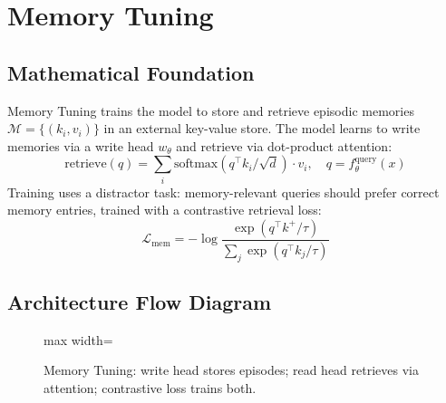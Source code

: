 \newpage
\section{Memory Tuning}

\subsection{Mathematical Foundation}
Memory Tuning trains the model to store and retrieve episodic memories $\mathcal{M} = \{(k_i, v_i)\}$ in an external key-value store. The model learns to write memories via a write head $w_\theta$ and retrieve via dot-product attention:
\begin{equation}
  \text{retrieve}(q) = \sum_i \text{softmax}(q^\top k_i / \sqrt{d}) \cdot v_i,\quad q = f_\theta^{\text{query}}(x)
\end{equation}
Training uses a distractor task: memory-relevant queries should prefer correct memory entries, trained with a contrastive retrieval loss:
\begin{equation}
  \mathcal{L}_{\text{mem}} = -\log \frac{\exp(q^\top k^+ / \tau)}{\sum_j \exp(q^\top k_j / \tau)}
\end{equation}

\subsection{Architecture Flow Diagram}

\begin{figure}[h]
\centering
\begin{adjustbox}{max width=\linewidth}
\end{adjustbox}
\caption{Memory Tuning: write head stores episodes; read head retrieves via attention; contrastive loss trains both.}
\end{figure}

